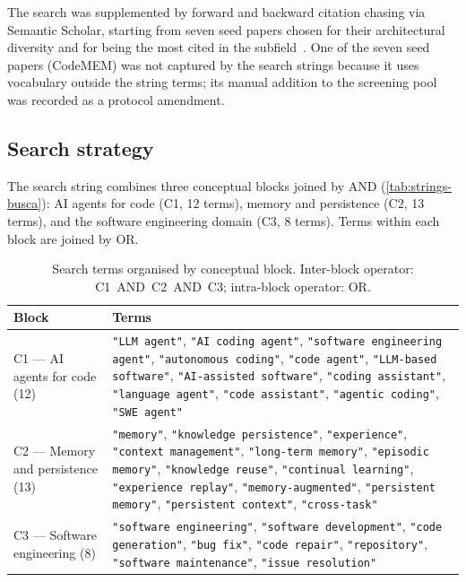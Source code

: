 The search was supplemented by forward and backward citation chasing via
Semantic Scholar, starting from seven seed papers chosen for their
architectural diversity and for being the most cited in the
subfield~\citep{du2026memory,joshi2025swebenchcl,wang2026codemem,deng2026memcoder,wu2025gcc,wang2026improving,lindenbauer2025ctimrover}.
One of the seven seed papers (CodeMEM) was not captured by the search
strings because it uses vocabulary outside the string terms;
its manual addition to the screening pool was recorded as a protocol
amendment.

\subsection{Search strategy}
\label{sec:busca}

The search string combines three conceptual blocks joined by AND
(\autoref{tab:strings-busca}): AI agents for code (C1, 12 terms),
memory and persistence (C2, 13 terms), and the software engineering
domain (C3, 8 terms).
Terms within each block are joined by OR.

\begin{table}[htbp]
  \centering
  \caption{Search terms organised by conceptual block.
           Inter-block operator: C1~AND~C2~AND~C3;
           intra-block operator: OR.}
  \label{tab:strings-busca}
  \small
  \begin{tabularx}{\textwidth}{@{}
    >{\raggedright\arraybackslash}p{2.8cm}
    X @{}}
    \toprule
    Block & Terms \\
    \midrule
    C1 --- AI agents for code (12)
    & \texttt{"LLM agent"},
      \texttt{"AI coding agent"},
      \texttt{"software engineering agent"},
      \texttt{"autonomous coding"},
      \texttt{"code agent"},
      \texttt{"LLM-based software"},
      \texttt{"AI-assisted software"},
      \texttt{"coding assistant"},
      \texttt{"language agent"},
      \texttt{"code assistant"},
      \texttt{"agentic coding"},
      \texttt{"SWE agent"} \\
    \addlinespace
    C2 --- Memory and persistence (13)
    & \texttt{"memory"},
      \texttt{"knowledge persistence"},
      \texttt{"experience"},
      \texttt{"context management"},
      \texttt{"long-term memory"},
      \texttt{"episodic memory"},
      \texttt{"knowledge reuse"},
      \texttt{"continual learning"},
      \texttt{"experience replay"},
      \texttt{"memory-augmented"},
      \texttt{"persistent memory"},
      \texttt{"persistent context"},
      \texttt{"cross-task"} \\
    \addlinespace
    C3 --- Software engineering (8)
    & \texttt{"software engineering"},
      \texttt{"software development"},
      \texttt{"code generation"},
      \texttt{"bug fix"},
      \texttt{"code repair"},
      \texttt{"repository"},
      \texttt{"software maintenance"},
      \texttt{"issue resolution"} \\
    \bottomrule
  \end{tabularx}
\end{table}

